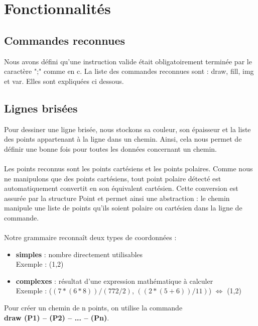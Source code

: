 \documentclass[a4paper, 12pt]{report}
\begin{document}
\newpage
\section{Fonctionnalités}

\subsection{Commandes reconnues}

Nous avons défini qu'une instruction valide était obligatoirement terminée par le caractère ";" comme en c. La liste des commandes reconnues sont : draw, fill, img et var. Elles sont expliquées ci dessous.

\subsection{Lignes brisées}
Pour dessiner une ligne brisée, nous stockons sa couleur, son épaisseur et la liste des points appartenant à la ligne dans un chemin. Ainsi, cela nous permet de définir une bonne fois pour toutes les données concernant un chemin.\\\\
Les points reconnus sont les points cartésiens et les points polaires. Comme nous ne manipulons que des points cartésiens, tout point polaire détecté est automatiquement convertit en son équivalent cartésien. Cette conversion est assurée par la structure Point et permet ainsi une abstraction : le chemin manipule une liste de points qu'ils soient polaire ou cartésien dans la ligne de commande.\\\\
Notre grammaire reconna\^it deux types de coordonnées :

\begin{itemize}
	\item \textbf{simples} : nombre directement utilisables\\
		Exemple : (1,2)
	\item \textbf{complexes} : résultat d'une expression mathématique à calculer\\
		Exemple : ($(7 * (6 * 8))/(772/2)$, $((2 * (5 + 6))/11)$) $\Leftrightarrow$ (1,2)\\
\end{itemize}

Pour créer un chemin de n points, on utilise la commande \\ \textbf{draw (P1) -- (P2) -- ... -- (Pn)}.\\
\end{document}
